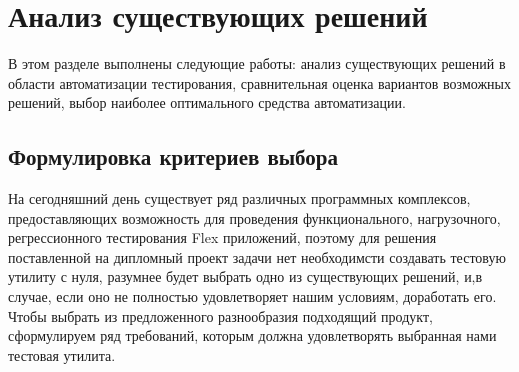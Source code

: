 \chapter*{Анализ существующих решений} 

В этом разделе выполнены следующие работы: анализ существующих решений в области
автоматизации тестирования, сравнительная оценка вариантов возможных решений, выбор
наиболее оптимального средства автоматизации.

\section*{Формулировка критериев выбора}
 
На сегодняшний день существует ряд различных программных комплексов, предоставляющих
возможность для проведения функционального, нагрузочного, регрессионного 
тестирования Flex приложений, поэтому для решения поставленной на дипломный
проект задачи нет необходимсти создавать тестовую утилиту с нуля, разумнее 
будет выбрать одно из существующих решений, и,в случае, если оно не полностью 
удовлетворяет нашим условиям, доработать его. Чтобы выбрать из предложенного 
разнообразия подходящий продукт, сформулируем ряд требований, 
которым должна удовлетворять выбранная нами тестовая утилита.

